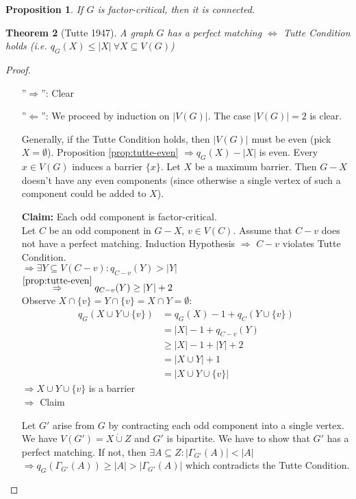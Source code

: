 \documentclass[11pt, a4paper]{article}
\newcommand{\abs}[1]{\left\lvert#1\right\rvert}
\newtheorem{theorem}{Theorem}[section]
\newtheorem{prop}[theorem]{Proposition}
\theoremstyle{remark}
\theoremstyle{definition}
\begin{document}
\begin{prop}\label{prop:factor-critical-conn}
	If $G$ is factor-critical, then it is connected.
\end{prop}

\begin{theorem}[Tutte 1947]
	A graph $G$ has a perfect matching $\Leftrightarrow$ Tutte Condition
	holds (i.e. $q_G(X)\leq\abs{X}\ \forall X\subseteq V(G)$)
\end{theorem}
\begin{proof}\
	\begin{enumerate}
		\item[''$\Rightarrow$'':] Clear
		\item[''$\Leftarrow$'':] We proceed by induction on $\abs{V(G)}$.
		The case $\abs{V(G)}=2$ is clear.

		Generally, if the Tutte Condition holds, then $\abs{V(G)}$ must be
		even (pick $X=\emptyset$). Proposition \ref{prop:tutte-even}
		$\Rightarrow q_G(X)-\abs{X}$ is even. Every $x\in V(G)$ induces a
		barrier $\{x\}$. Let $X$ be a maximum barrier. Then $G-X$ doesn't
		have any even components (since otherwise a single vertex of such a
		component could be added to $X$).

		\textbf{Claim:} Each odd component is factor-critical. \\
		Let $C$ be an odd component in $G-X$, $v\in V(C)$. Assume that $C-v$
		does not have a perfect matching. Induction Hypothesis $\Rightarrow$
		$C-v$ violates Tutte Condition. \\
		$\Rightarrow \exists Y\subseteq V(C-v): q_{C-v}(Y)>\abs{Y}$ \\
		$\stackrel{\ref{prop:tutte-even}}{\Rightarrow} q_{C-v}(Y)\geq \abs{Y}+2$ \\
		Observe $X\cap\{v\}=Y\cap\{v\}=X\cap Y=\emptyset$:
		\begin{align*}
			q_G(X\cup Y\cup\{v\}) & =q_G(X)-1+q_C(Y\cup\{v\}) \\
			                      & =\abs{X}-1+q_{C-v}(Y)     \\
			                      & \geq\abs{X}-1+\abs{Y}+2   \\
			                      & =\abs{X\cup Y}+1          \\
			                      & =\abs{X\cup Y\cup\{v\}}
		\end{align*}
		$\Rightarrow X\cup Y\cup\{v\}$ is a barrier \\
		$\Rightarrow$ Claim

		Let $G'$ arise from $G$ by contracting each odd component into a
		single vertex. We have $V(G')=X\dot\cup Z$ and $G'$ is bipartite. We
		have to show that $G'$ has a perfect matching. If not, then $\exists
			A\subseteq Z: \abs{\Gamma_{G'}(A)}<\abs{A}$ \\ $\Rightarrow
			q_G(\Gamma_{G'}(A))\geq \abs{A}>\abs{\Gamma_{G'}(A)}$ which
		contradicts the Tutte Condition.
	\end{enumerate}
\end{proof}
\end{document}
